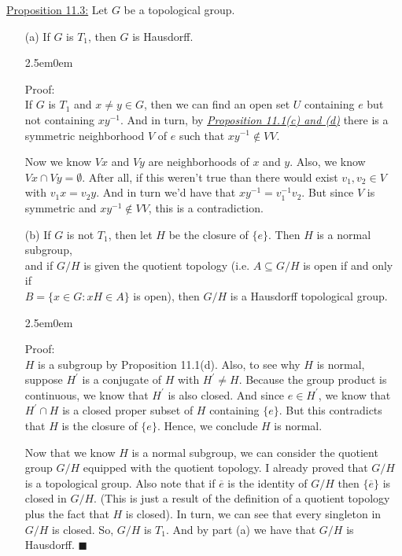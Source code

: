 \documentclass{book}
\newcommand{\inLinkRap}[2]{{\color{blue}\hyperlink{#1}{\textit{#2}}}}
\newcommand{\exTwo}{%
   \color{Purple}%
   \fontsize{13}{15}\selectfont%
}
\newcommand{\exThreeP}{%
   \color{RedViolet}%
   \fontsize{12}{14}\selectfont%
}
\newenvironment{myIndent}{%
   \begin{adjustwidth}{2.5em}{0em}%
}{%
   \end{adjustwidth}%
}
\newcommand{\retTwo}{\hfill\bigbreak}
\begin{document}
\exTwo\ul{Proposition 11.3:} Let $G$ be a topological group.
\begin{enumerate}
	\item[(a)] If $G$ is $T_1$, then $G$ is Hausdorff.
	
	\begin{myIndent}\exThreeP
		Proof:\\
		If $G$ is $T_1$ and $x \neq y \in G$, then we can find an open set $U$ containing $e$ but\\ not containing $xy^{-1}$. And in turn, by \inLinkRap{Folland proposition 11.1}{Proposition 11.1(c) and (d)} there is a symmetric neighborhood $V$ of $e$ such that $xy^{-1} \notin VV$.\retTwo

		Now we know $Vx$ and $Vy$ are neighborhoods of $x$ and $y$. Also, we know\\ $Vx \cap Vy = \emptyset$. After all, if this weren't true than there would exist $v_1, v_2 \in V$\\ with $v_1 x = v_2 y$. And in turn we'd have that $xy^{-1} = v_1^{-1}v_2$. But since $V$ is\\ symmetric and $xy^{-1} \notin VV$, this is a contradiction.\retTwo
	\end{myIndent}

	\item[(b)] If $G$ is not $T_1$, then let $H$ be the closure of $\{e\}$. Then $H$ is a normal subgroup,\\ and if $G/H$ is given the quotient topology (i.e. $A \subseteq G/H$ is open if and only if\\ $B = \{x \in G : xH \in A\}$ is open), then $G/H$ is a Hausdorff topological group.
	
	\begin{myIndent}\exThreeP
		Proof:\\
		$H$ is a subgroup by Proposition 11.1(d). Also, to see why $H$ is normal, suppose $H^\prime$ is a conjugate of $H$ with $H^\prime \neq H$. Because the group product is continuous, we know that $H^\prime$ is also closed. And since $e \in H^\prime$, we know that $H^\prime \cap H$ is a closed proper subset of $H$ containing $\{e\}$. But this contradicts that $H$ is the closure of $\{e\}$. Hence, we conclude $H$ is normal.\retTwo

		Now that we know $H$ is a normal subgroup, we can consider the quotient group $G/H$ equipped with the quotient topology. I already proved that $G/H$ is a topological group. Also note that if $\overline{e}$ is the identity of $G/H$ then $\{\overline{e}\}$ is closed in $G/H$. (This is just  a result of the definition of a quotient topology plus the fact that $H$ is closed). In turn, we can see that every singleton in $G/H$ is closed. So, $G/H$ is $T_1$. And by part (a) we have that $G/H$ is Hausdorff. $\blacksquare$\newpage
	\end{myIndent}
\end{enumerate}
\end{document}
